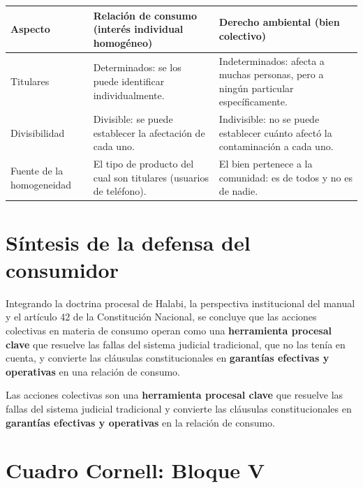 \documentclass[12pt,oneside]{book}
\begin{document}
\begin{center}
{\small\renewcommand{\arraystretch}{1.25}
\begin{tabularx}{\textwidth}{@{}B{0.20\textwidth} Y Y@{}}
\toprule
\textbf{Aspecto} & \textbf{Relaci\'on de consumo (inter\'es individual homog\'eneo)} & \textbf{Derecho ambiental (bien colectivo)} \\
\midrule
Titulares & Determinados: se los puede identificar individualmente. & Indeterminados: afecta a muchas personas, pero a ning\'un particular espec\'ificamente. \\
\addlinespace
Divisibilidad & Divisible: se puede establecer la afectaci\'on de cada uno. & Indivisible: no se puede establecer cu\'anto afect\'o la contaminaci\'on a cada uno. \\
\addlinespace
Fuente de la homogeneidad & El tipo de producto del cual son titulares (usuarios de tel\'efono). & El bien pertenece a la comunidad: es de todos y no es de nadie. \\
\bottomrule
\end{tabularx}}
\end{center}

\section{S\'intesis de la defensa del consumidor}

Integrando la doctrina procesal de Halabi, la perspectiva institucional del manual y el art\'iculo 42 de la Constituci\'on Nacional, se concluye que las acciones colectivas en materia de consumo operan como una \textbf{herramienta procesal clave} que resuelve las fallas del sistema judicial tradicional, que no las ten\'ia en cuenta, y convierte las cl\'ausulas constitucionales en \textbf{garant\'ias efectivas y operativas} en una relaci\'on de consumo.

\begin{important}
Las acciones colectivas son una \textbf{herramienta procesal clave} que resuelve las fallas del sistema judicial tradicional y convierte las cl\'ausulas constitucionales en \textbf{garant\'ias efectivas y operativas} en la relaci\'on de consumo.
\end{important}

\section{Cuadro Cornell: Bloque V}
\end{document}
